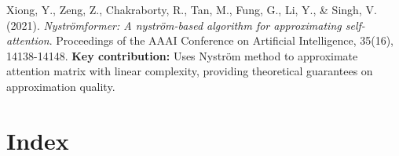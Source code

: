 \documentclass[11pt]{article}
\begin{document}
Xiong, Y., Zeng, Z., Chakraborty, R., Tan, M., Fung, G., Li, Y., \& Singh, V. (2021).
\textit{Nyströmformer: A nyström-based algorithm for approximating self-attention}.
Proceedings of the AAAI Conference on Artificial Intelligence, 35(16), 14138-14148.
\textbf{Key contribution:} Uses Nyström method to approximate attention matrix with linear complexity, providing theoretical guarantees on approximation quality.

\section{Index}
\end{document}
